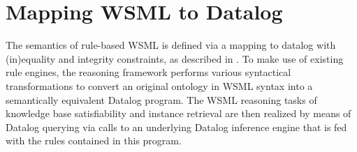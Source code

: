 \newcommand{\smtxtit}[1]{\ensuremath{\textit{\scriptsize{#1}}}}
\newcommand{\trans}[1]{\ensuremath{\tau_{#1}}\xspace}
\newcommand{\transtxt}[1]{\trans{\smtxtit{#1}}}
\def\transax{\transtxt{axioms}}
\def\transnorm{\transtxt{norm}}
\def\translt{\transtxt{lt}}
\def\transdlog{\transtxt{datalog}}

\def\LE{\ensuremath{\mathcal{L\!E}}\xspace}
\def\O{\ensuremath{\mathcal{O}}\xspace}
\def\P{\ensuremath{\mathcal{P}}\xspace}
\newcommand{\powset}[1]{\ensuremath{2^{#1}}\xspace}
\def\lprl{\ensuremath{\;:\!-\:}}
\def\cstr{\ensuremath{\;!-\:}}
\def\qury{\ensuremath{\;?-\:}}
\def\dlogrule{\lprl}
\def\dlogcstr{\square\lprl}
\def\dlogand{\wedge}
\def\dlognot{\sim}
\newcommand{\dlogfact}[1]{\ensuremath{{#1}\;.}}

\newcommand{\predicate}[1]{\ensuremath{p_{#1}}\xspace}
\newcommand{\predsubtxt}[1]{\mathrm{\sf #1}}
\def\psco{\predicate{\predsubtxt{sco}}}
\def\pmo{\predicate{\predsubtxt{mo}}}
\def\phval{\predicate{\predsubtxt{hval}}}
\def\pitype{\predicate{\predsubtxt{itype}}}
\def\potype{\predicate{\predsubtxt{otype}}}
\def\mlaxioms{\ensuremath{P_{\smtxtit{meta}}}\xspace}

\newcommand{\typeof}{\ensuremath{typeOf}\xspace}

\def\bla{\textbf{{\sf bla}}\xspace}

\section{Mapping WSML to Datalog\label{sec:mapping}}

The semantics of rule-based WSML is defined via a mapping to
datalog with (in)equality and integrity constraints, as described
in \cite{wsml-spec}. To make use of existing rule engines, the
reasoning framework performs various syntactical transformations
to convert an original ontology in WSML syntax into a semantically
equivalent Datalog program. The WSML reasoning tasks of knowledge
base satisfiability and instance retrieval are then realized by
means of Datalog querying via calls to an underlying Datalog
inference engine that is fed with the rules contained in this
program.






